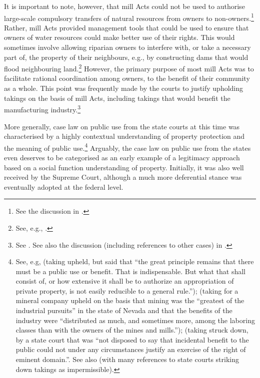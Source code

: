 It is important to note, however, that mill Acts could not be used to authorise large-scale compulsory transfers of natural resources from owners to non-owners.\footnote{See the discussion in \cite{head85}.} Rather, mill Acts provided management tools that could be used to ensure that owners of water resources could make better use of their rights. This would sometimes involve allowing riparian owners to interfere with, or take a necessary part of, the property of their neighbours, e.g., by constructing dams that would flood neighbouring land.\footnote{See, e.g., \cite[265]{staples03}.} However, the primary purpose of most mill Acts was to facilitate rational coordination among owners, to the benefit of their community as a whole. This point was frequently made by the courts to justify upholding takings on the basis of mill Acts, including takings that would benefit the manufacturing industry.\footnote{See \cite{fiske31}. See also the discussion (including references to other cases) in \cite{head85}.}

More generally, case law on public use from the state courts at this time was characterised by a highly contextual understanding of property protection and the meaning of public use.\footnote{See, e.g, \cite{scudder32} (taking upheld, but said that ``the great principle remains that there must be a public use or benefit. That is indispensable. But what that shall consist of, or how extensive it shall be to authorize an appropriation of private property, is not easily reducible to a general rule.'');  \cite[409]{seawell76} (taking for a mineral company upheld on the basis that mining was the ``greatest of the industrial pursuits'' in the state of Nevada and that the benefits of the industry were ``distributed as much, and sometimes more, among the laboring classes than with the owners of the mines and mills.''); \cite[337]{ryerson77} (taking struck down, by a state court that was ``not disposed to say that incidental benefit to the public could not under any circumstances justify an exercise of the right of eminent domain.''. See also \cite{gray11} (with many references to state courts striking down takings as impermissible).} Arguably, the case law on public use from the states even deserves to be categorised as an early example of a legitimacy approach based on a social function understanding of property. Initially, it was also well received by the Supreme Court, although a much more deferential stance was eventually adopted at the federal level.

